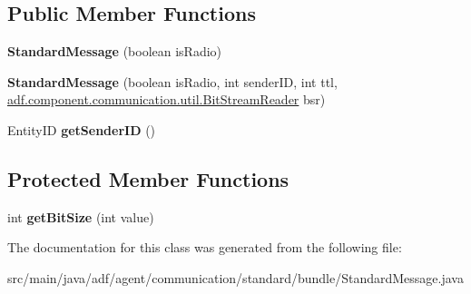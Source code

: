 \subsection*{Public Member Functions}
\begin{DoxyCompactItemize}
\item 
\hypertarget{classadf_1_1agent_1_1communication_1_1standard_1_1bundle_1_1StandardMessage_a4e50f8d38f29b5bc973b1c48fec49922}{}\label{classadf_1_1agent_1_1communication_1_1standard_1_1bundle_1_1StandardMessage_a4e50f8d38f29b5bc973b1c48fec49922} 
{\bfseries Standard\+Message} (boolean is\+Radio)
\item 
\hypertarget{classadf_1_1agent_1_1communication_1_1standard_1_1bundle_1_1StandardMessage_a7cc9600600c85f600c4b9b52337313a3}{}\label{classadf_1_1agent_1_1communication_1_1standard_1_1bundle_1_1StandardMessage_a7cc9600600c85f600c4b9b52337313a3} 
{\bfseries Standard\+Message} (boolean is\+Radio, int sender\+ID, int ttl, \hyperlink{classadf_1_1component_1_1communication_1_1util_1_1BitStreamReader}{adf.\+component.\+communication.\+util.\+Bit\+Stream\+Reader} bsr)
\item 
\hypertarget{classadf_1_1agent_1_1communication_1_1standard_1_1bundle_1_1StandardMessage_aa9a0ef1976869b50f0b0cda1e93b2666}{}\label{classadf_1_1agent_1_1communication_1_1standard_1_1bundle_1_1StandardMessage_aa9a0ef1976869b50f0b0cda1e93b2666} 
Entity\+ID {\bfseries get\+Sender\+ID} ()
\end{DoxyCompactItemize}
\subsection*{Protected Member Functions}
\begin{DoxyCompactItemize}
\item 
\hypertarget{classadf_1_1agent_1_1communication_1_1standard_1_1bundle_1_1StandardMessage_a159c1d41eaddb08cec8f54465c3d33c4}{}\label{classadf_1_1agent_1_1communication_1_1standard_1_1bundle_1_1StandardMessage_a159c1d41eaddb08cec8f54465c3d33c4} 
int {\bfseries get\+Bit\+Size} (int value)
\end{DoxyCompactItemize}


The documentation for this class was generated from the following file\+:\begin{DoxyCompactItemize}
\item 
src/main/java/adf/agent/communication/standard/bundle/Standard\+Message.\+java\end{DoxyCompactItemize}
